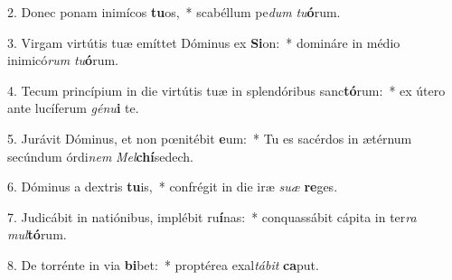 2. Donec ponam inimícos \textbf{tu}os,~*  scabéllum pe\textit{dum} \textit{tu}\textbf{ó}rum.\

3. Virgam virtútis tuæ emíttet Dóminus ex \textbf{Si}on:~*  domináre in médio inimicó\textit{rum} \textit{tu}\textbf{ó}rum.\

4. Tecum princípium in die virtútis tuæ in splendóribus sanc\textbf{tó}rum:~*  ex útero ante lucíferum \textit{gé}\textit{nu}\textbf{i} te.\

5. Jurávit Dóminus, et non pœnitébit \textbf{e}um:~*  Tu es sacérdos in ætérnum secúndum órdi\textit{nem} \textit{Mel}\textbf{chí}sedech.\

6. Dóminus a dextris \textbf{tu}is,~*  confrégit in die iræ \textit{su}\textit{æ} \textbf{re}ges.\

7. Judicábit in natiónibus, implébit ru\textbf{í}nas:~*  conquassábit cápita in ter\textit{ra} \textit{mul}\textbf{tó}rum.\

8. De torrénte in via \textbf{bi}bet:~*  proptérea exal\textit{tá}\textit{bit} \textbf{ca}put.\

